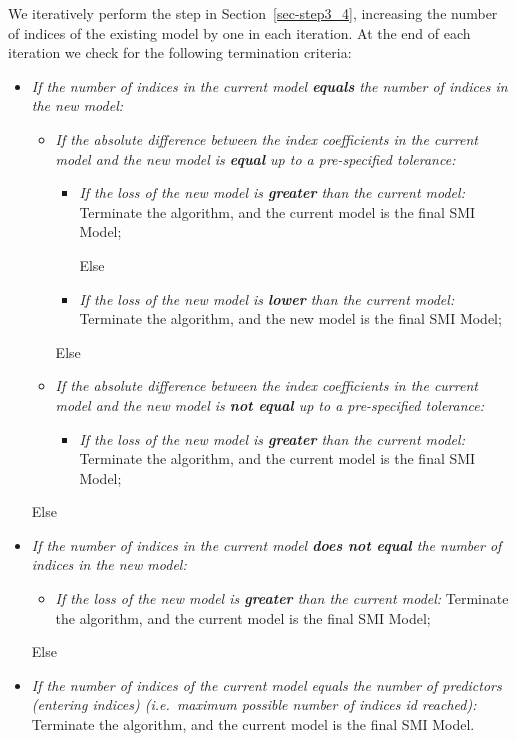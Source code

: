 \documentclass[11pt,a4paper,]{article}
\providecommand{\tightlist}{%
  \setlength{\itemsep}{0pt}\setlength{\parskip}{0pt}}
\begin{document}
We iteratively perform the step in Section~\ref{sec-step3_4}, increasing
the number of indices of the existing model by one in each iteration. At
the end of each iteration we check for the following termination
criteria:

\begin{itemize}
\item
  \emph{If the number of indices in the current model \textbf{equals}
  the number of indices in the new model:}

  \begin{itemize}
  \item
    \emph{If the absolute difference between the index coefficients in
    the current model and the new model is \textbf{equal} up to a
    pre-specified tolerance:}

    \begin{itemize}
    \item
      \emph{If the loss of the new model is \textbf{greater} than the
      current model:} Terminate the algorithm, and the current model is
      the final SMI Model;

      Else
    \item
      \emph{If the loss of the new model is \textbf{lower} than the
      current model:} Terminate the algorithm, and the new model is the
      final SMI Model;
    \end{itemize}

    Else
  \item
    \emph{If the absolute difference between the index coefficients in
    the current model and the new model is \textbf{not equal} up to a
    pre-specified tolerance:}

    \begin{itemize}
    \tightlist
    \item
      \emph{If the loss of the new model is \textbf{greater} than the
      current model:} Terminate the algorithm, and the current model is
      the final SMI Model;
    \end{itemize}
  \end{itemize}

  Else
\item
  \emph{If the number of indices in the current model \textbf{does not
  equal} the number of indices in the new model:}

  \begin{itemize}
  \tightlist
  \item
    \emph{If the loss of the new model is \textbf{greater} than the
    current model:} Terminate the algorithm, and the current model is
    the final SMI Model;
  \end{itemize}

  Else
\item
  \emph{If the number of indices of the current model equals the number
  of predictors (entering indices) (i.e.~maximum possible number of
  indices id reached):} Terminate the algorithm, and the current model
  is the final SMI Model.
\end{itemize}
\end{document}
